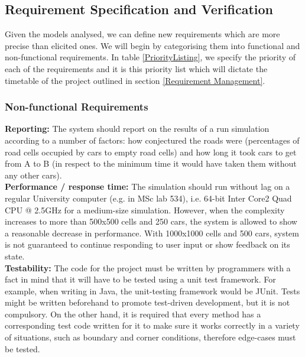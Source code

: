 \documentclass{article}
\begin{document}
\subsection{Requirement Specification and Verification}

Given the models analysed, we can define new requirements which are more precise than elicited ones. We will begin by categorising them into functional and non-functional requirements. In table \ref{PriorityListing}, we specify the priority of each of the requirements and it is this priority list which will dictate the timetable of the project outlined in section \ref{Requirement Management}.\\

\subsubsection{Non-functional Requirements}
\textbf{Reporting:} The system should report on the results of a run simulation according to a number of factors: how conjectured the roads were (percentages of road cells occupied by cars to empty road cells) and how long it took cars to get from A to B (in respect to the minimum time it would have taken them without any other cars).\\

\noindent
\textbf{Performance / response time:} The simulation should run without lag on a regular University computer (e.g. in MSc lab 534), i.e. 64-bit Inter Core2 Quad CPU @ 2.5GHz for a medium-size simulation. 
However, when the complexity increases to more than 500x500 cells and 250 cars, the system is allowed to show a reasonable decrease in performance. 
With 1000x1000 cells and 500 cars, system is not guaranteed to continue responding to user input or show feedback on its state.\\

\noindent
\textbf{Testability:} The code for the project must be written by programmers with a fact in mind that it will have to be tested using a unit test framework. For example, when writing in Java, the unit-testing framework would be JUnit. 
Tests might be written beforehand to promote test-driven development, but it is not compulsory. 
On the other hand, it is required that every method has a corresponding test code written for it to make sure it works correctly in a variety of situations, such as boundary and corner conditions, therefore edge-cases must be tested.\\
\end{document}
